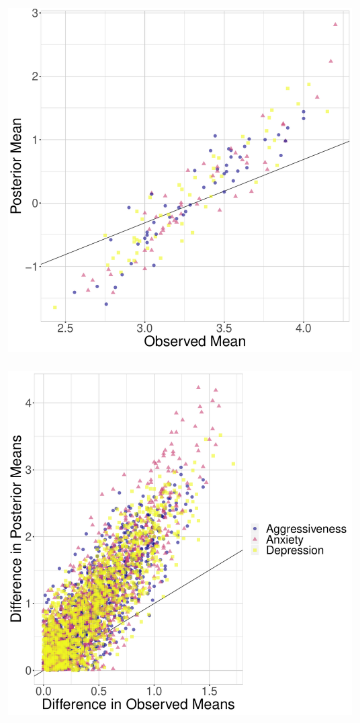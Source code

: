 \documentclass[a4paper]{article}
\begin{document}
\begin{figure}[!ht]
\begin{subfigure}{.5\textwidth}
	\centering
	\includegraphics[width=.9\textwidth]{figures/corrObsMeanPostMean.pdf}
\end{subfigure}%
\begin{subfigure}{.5\textwidth}
	\centering
	\includegraphics[width=.9\textwidth]{figures/diffCorrObsMeanPostMean.pdf}

\end{subfigure}
\end{figure}
\end{document}
